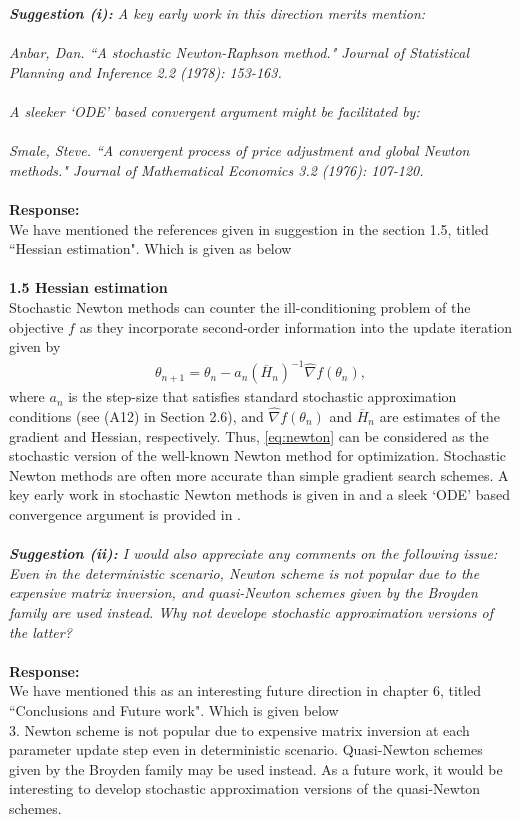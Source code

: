 \documentclass[12pt]{article}
\begin{document}
\textit{\textbf{Suggestion (i): } A key early work in this direction merits mention: \\  \\Anbar, Dan. ``A stochastic Newton-Raphson method." Journal of Statistical Planning and Inference 2.2 (1978): 153-163.\\ \\ A sleeker `ODE' based convergent argument might be facilitated by:\\ \\  Smale, Steve. ``A convergent process of price adjustment and global Newton methods." Journal of Mathematical Economics 3.2 (1976): 107-120.\\ \\}
 \textbf{Response:}\\
We have mentioned the references given in suggestion in the section 1.5, titled ``Hessian estimation". Which is given as below \\ \\
\textbf{1.5 Hessian estimation} \\
Stochastic Newton methods can counter the ill-conditioning problem of the objective $f$ as they incorporate second-order information into the update iteration given by   
\begin{align}
\label{eq:newton}
\theta_{n+1} = \theta_n - a_n (\overline H_n)^{-1}\widehat\nabla f(\theta_n), 
\end{align}
where $a_n$ is the step-size that satisfies standard stochastic approximation conditions (see (A12) in Section 2.6), and $\widehat\nabla f(\theta_n)$ and $\overline H_n$ are estimates of the gradient and Hessian, respectively. Thus, \eqref{eq:newton} can be considered as  the stochastic version of the well-known Newton method for optimization. Stochastic Newton methods are often more accurate than simple gradient search schemes. A key early work in stochastic Newton methods  is given in \cite{anbar1978stochastic} and a sleek `ODE' based convergence argument is provided in \cite{smale1976convergent}.\\ \\
\textit{\textbf{Suggestion (ii):} I would also appreciate any comments on the following issue: Even in the deterministic scenario, Newton scheme is not popular due to the expensive matrix inversion, and quasi-Newton schemes given by the Broyden family are used instead. Why not develope stochastic approximation versions of the latter?  }\\ \\
 \textbf{Response:}\\
 We have mentioned this as an interesting future direction in chapter 6, titled ``Conclusions and Future work". Which is given below \\
 3. Newton scheme is not popular due to expensive matrix inversion at each parameter update step even in deterministic scenario. Quasi-Newton schemes given by the Broyden family may be used instead. As a future work, it would be interesting to develop stochastic approximation versions of the quasi-Newton schemes.  





\end{document}

